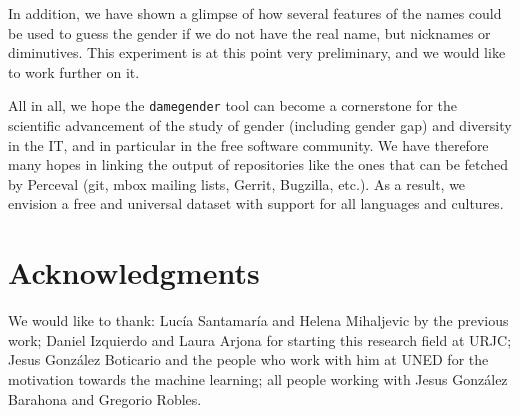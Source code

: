 \documentclass[a4paper]{article}
\begin{document}
In addition, we have shown a glimpse of how several features of the names could be used to guess the gender if we do not have the real name, but nicknames or diminutives.
This experiment is at this point very preliminary, and we would like to work further on it.

All in all, we hope the \texttt{damegender} tool can become a cornerstone for the scientific advancement of the study of gender (including gender gap) and diversity in the IT, and in particular in the free software community.
We have therefore many hopes in linking the output of repositories like the ones that can be fetched by Perceval (git, mbox mailing lists, Gerrit, Bugzilla, etc.).
As a result, we envision a free and universal dataset with support for all languages and cultures.


\section*{Acknowledgments}

We would like to thank: Lucía Santamaría and Helena Mihaljevic by the previous work; Daniel Izquierdo and Laura Arjona for starting this research field at URJC; Jesus González Boticario and the people who work with him at UNED for the motivation towards the machine learning; all people working with Jesus González Barahona and Gregorio Robles.

 

\end{document}

